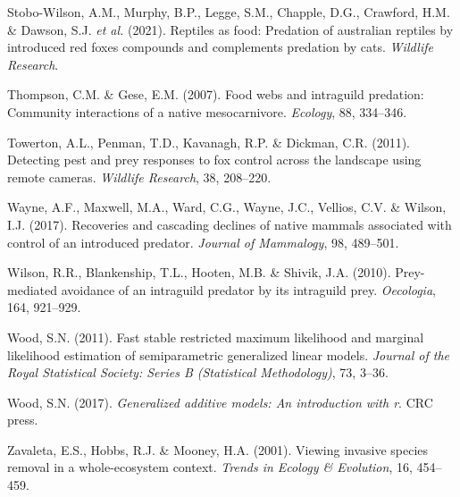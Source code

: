 \documentclass[]{elsarticle} %
\begin{document}
\leavevmode\hypertarget{ref-stobo2021reptiles}{}%
Stobo-Wilson, A.M., Murphy, B.P., Legge, S.M., Chapple, D.G., Crawford, H.M. \& Dawson, S.J. \emph{et al.} (2021). Reptiles as food: Predation of australian reptiles by introduced red foxes compounds and complements predation by cats. \emph{Wildlife Research}.

\leavevmode\hypertarget{ref-thompson2007food}{}%
Thompson, C.M. \& Gese, E.M. (2007). Food webs and intraguild predation: Community interactions of a native mesocarnivore. \emph{Ecology}, 88, 334--346.

\leavevmode\hypertarget{ref-towerton2011}{}%
Towerton, A.L., Penman, T.D., Kavanagh, R.P. \& Dickman, C.R. (2011). Detecting pest and prey responses to fox control across the landscape using remote cameras. \emph{Wildlife Research}, 38, 208--220.

\leavevmode\hypertarget{ref-wayne2017recoveries}{}%
Wayne, A.F., Maxwell, M.A., Ward, C.G., Wayne, J.C., Vellios, C.V. \& Wilson, I.J. (2017). Recoveries and cascading declines of native mammals associated with control of an introduced predator. \emph{Journal of Mammalogy}, 98, 489--501.

\leavevmode\hypertarget{ref-wilson2010prey}{}%
Wilson, R.R., Blankenship, T.L., Hooten, M.B. \& Shivik, J.A. (2010). Prey-mediated avoidance of an intraguild predator by its intraguild prey. \emph{Oecologia}, 164, 921--929.

\leavevmode\hypertarget{ref-wood2011}{}%
Wood, S.N. (2011). Fast stable restricted maximum likelihood and marginal likelihood estimation of semiparametric generalized linear models. \emph{Journal of the Royal Statistical Society: Series B (Statistical Methodology)}, 73, 3--36.

\leavevmode\hypertarget{ref-wood2017}{}%
Wood, S.N. (2017). \emph{Generalized additive models: An introduction with r}. CRC press.

\leavevmode\hypertarget{ref-zavaleta2001}{}%
Zavaleta, E.S., Hobbs, R.J. \& Mooney, H.A. (2001). Viewing invasive species removal in a whole-ecosystem context. \emph{Trends in Ecology \& Evolution}, 16, 454--459.
\end{document}
